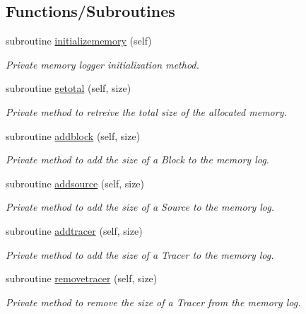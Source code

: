 \subsection*{Functions/\+Subroutines}
\begin{DoxyCompactItemize}
\item 
subroutine \hyperlink{namespacesimulation__memory__mod_ac8306165e4ec88fec9a2b8b719f61893}{initializememory} (self)
\begin{DoxyCompactList}\small\item\em Private memory logger initialization method. \end{DoxyCompactList}\item 
subroutine \hyperlink{namespacesimulation__memory__mod_acf04d6b930ed3ffbc0950afd86033c51}{getotal} (self, size)
\begin{DoxyCompactList}\small\item\em Private method to retreive the total size of the allocated memory. \end{DoxyCompactList}\item 
subroutine \hyperlink{namespacesimulation__memory__mod_a4169689db37b3ba35e092096a7019f80}{addblock} (self, size)
\begin{DoxyCompactList}\small\item\em Private method to add the size of a Block to the memory log. \end{DoxyCompactList}\item 
subroutine \hyperlink{namespacesimulation__memory__mod_a940ff42fa3a49423f9ac98da2bffa54c}{addsource} (self, size)
\begin{DoxyCompactList}\small\item\em Private method to add the size of a Source to the memory log. \end{DoxyCompactList}\item 
subroutine \hyperlink{namespacesimulation__memory__mod_a5770021491589bbd61ea112d113a9c9d}{addtracer} (self, size)
\begin{DoxyCompactList}\small\item\em Private method to add the size of a Tracer to the memory log. \end{DoxyCompactList}\item 
subroutine \hyperlink{namespacesimulation__memory__mod_a5f95539e9740401e7046b79c40ad2ecd}{removetracer} (self, size)
\begin{DoxyCompactList}\small\item\em Private method to remove the size of a Tracer from the memory log. \end{DoxyCompactList}\item 

\end{DoxyCompactItemize}
